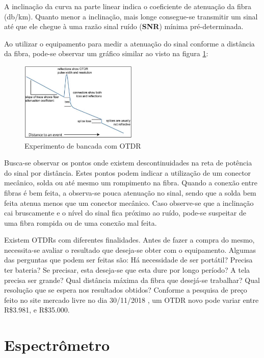 \documentclass[article]{IEEEtran}
\begin{document}
A inclinação da curva na parte linear indica o coeficiente de atenuação da fibra (db/km). Quanto menor a inclinação, mais longe consegue-se transmitir um sinal até que ele chegue à uma razão sinal ruído (\textbf{SNR}) mínima pré-determinada.

Ao utilizar o equipamento para medir a atenuação do sinal conforme a distância da fibra, pode-se observar um gráfico similar ao visto na figura \ref{fig:OTDR_grafico}:
\begin{figure}[H]
	\includegraphics[width=0.5\textwidth]{images/OTDR_grafico.JPG}
	\caption{Experimento de bancada com OTDR}
	\label{fig:OTDR_grafico}
\end{figure} 

Busca-se observar os pontos onde existem descontinuidades na reta de potência do sinal por distância. Estes pontos podem indicar a utilização de um conector mecânico, solda ou até mesmo um rompimento na fibra. Quando a conexão entre fibras é bem feita, a observa-se pouca atenuação no sinal, sendo que a solda bem feita atenua menos que um conector mecânico. Caso observe-se que a inclinação cai bruscamente e o nível do sinal fica próximo ao ruído, pode-se suspeitar de uma fibra rompida ou de uma conexão mal feita.

Existem OTDRs com diferentes finalidades. Antes de fazer a compra do mesmo, necessita-se avaliar o resultado que deseja-se obter com o equipamento. Algumas das perguntas que podem ser feitas são: Há necessidade de ser portátil? Precisa ter bateria? Se precisar, esta deseja-se que esta dure por longo período? A tela precisa ser grande? Qual distância máxima da fibra que desejá-se trabalhar? Qual resolução que se espera nos resultados obtidos? Conforme a pesquisa de preço feito no site mercado livre no dia 30/11/2018 \cite{M_LIVRE}, um OTDR novo pode variar entre R\$3.981, e R\$35.000.

\section{Espectrômetro}
\end{document}
